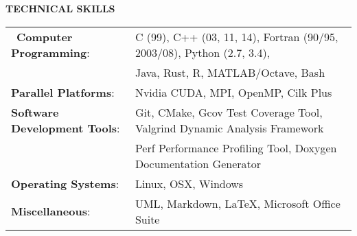 \documentclass[legalpaper]{article}
\begin{document}
\begin{center}
  \begin{shaded}
    { \color{white} \textbf{ TECHNICAL SKILLS}}
  \end{shaded}
\end{center}
\begin{tabular}{l p{5in}}
  ~\textbf{Computer Programming}: &  C (99), C++ (03, 11, 14), Fortran (90/95, 2003/08), Python (2.7, 3.4),\\
  & Java, Rust, R, MATLAB/Octave, Bash\\
  \rule{0pt}{4ex} \textbf{Parallel Platforms}:   &  Nvidia CUDA, MPI, OpenMP, Cilk Plus\\
  \rule{0pt}{4ex} \textbf{Software Development Tools}:    &  Git, CMake, Gcov Test Coverage Tool, Valgrind Dynamic Analysis Framework\\
  & Perf Performance Profiling Tool, Doxygen Documentation Generator\\
  \rule{0pt}{4ex} \textbf{Operating Systems}:    &  Linux, OSX, Windows\\
  \rule{0pt}{4ex} \textbf{Miscellaneous}:        &  UML, Markdown, \LaTeX, Microsoft Office Suite\\
\end{tabular}



\end{document}
